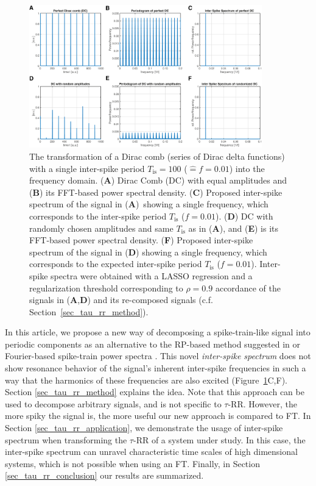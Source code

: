 \documentclass[entropy,article,accept,pdftex,moreauthors]{Definitions/mdpi}
\begin{document}
\begin{figure}[H]
 \includegraphics[width=0.9\textwidth]{./figures/fig_tau_rr_dirac_comb}
 \caption{The transformation of a Dirac comb (series of Dirac delta functions) with a single inter-spike period $T_{\text{is}}=100$ ($\widehat{=}f=0.01$) 
 into the frequency domain. 
 (\textbf{A}) Dirac Comb (DC) with equal amplitudes and
 (\textbf{B}) its FFT-based power spectral density.
 (\textbf{C}) Proposed inter-spike spectrum of the signal in (\textbf{A})~showing a single frequency, which corresponds to the inter-spike period $T_{\text{is}}$ ($f=0.01$).
 (\textbf{D}) DC with randomly chosen amplitudes and same $T_{\text{is}}$ as in (\textbf{A}), and
 (\textbf{E}) is its FFT-based power spectral density. 
 (\textbf{F}) Proposed inter-spike spectrum of the signal in (\textbf{D}) showing a single frequency, which corresponds to the expected inter-spike period $T_{\text{is}}$ ($f=0.01$). 
 Inter-spike spectra were obtained with a LASSO regression and a regularization threshold corresponding to $\rho=0.9$ accordance of the signals in (\textbf{A},\textbf{D}) and 
 its re-composed signals (c.f. Section~\ref{sec_tau_rr_method}). 
}
\label{fig_tau_rr_dirac_comb}
\end{figure}

In this article, we propose a new way of decomposing a spike-train-like signal into periodic components as 
an alternative to the RP-based method suggested in \cite{Zbilut2008} or Fourier-based spike-train power 
spectra \cite{Dummer2014}. This novel \textit{inter-spike spectrum} does not show resonance 
behavior of the signal's inherent inter-spike frequencies in such a way that the harmonics of these frequencies are also excited (Figure~\ref{fig_tau_rr_dirac_comb}C,F). Section \ref{sec_tau_rr_method} explains the idea. Note that this approach can be used to decompose arbitrary signals, and is not specific to $\tau$-RR. However, the more spiky the signal is, the more useful our new approach is compared to 
FT. In Section \ref{sec_tau_rr_application}, we demonstrate the usage of inter-spike spectrum when transforming the $\tau$-RR of a system under study. In this case, the inter-spike spectrum 
can unravel characteristic time scales of high dimensional systems, which is not possible when using an FT. Finally, in Section \ref{sec_tau_rr_conclusion} our results are summarized.
\end{document}
